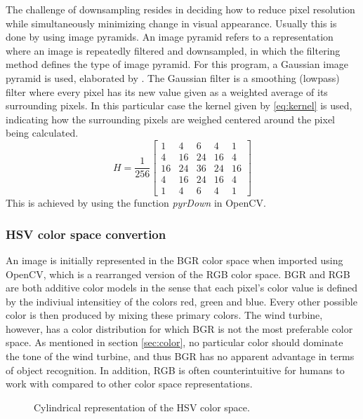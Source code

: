 \documentclass[a4paper,10pt]{article}
\begin{document}
      The challenge of downsampling resides in deciding how to reduce pixel resolution while simultaneously minimizing change in visual appearance. Usually this is done by using image pyramids. An image pyramid refers to a representation where an image is repeatedly filtered and downsampled, in which the filtering method defines the type of image pyramid. For this program, a Gaussian image pyramid is used, elaborated by \citet{birt81}. The Gaussian filter is a smoothing (lowpass) filter where every pixel has its new value given as a weighted average of its surrounding pixels. In this particular case the kernel given by \eqref{eq:kernel} is used, indicating how the surrounding pixels are weighed centered around the pixel being calculated.
      \begin{equation}
      \label{eq:kernel}
	H = \frac{1}{256}\begin{bmatrix} 
	     1 & 4 & 6 & 4 & 1 \\
	     4 & 16 & 24 & 16 & 4 \\
	     16 & 24 & 36 & 24 & 16 \\
	     4 & 16 & 24 & 16 & 4 \\
	     1 & 4 & 6 & 4 & 1
	    \end{bmatrix}
      \end{equation}
      This is achieved by using the function \emph{pyrDown} in OpenCV.
      
    \subsubsection{HSV color space convertion}
    An image is initially represented in the BGR color space when imported using OpenCV, which is a rearranged version of the RGB color space. BGR and RGB are both additive color models in the sense that each pixel's color value is defined by the indiviual intensitiey of the colors red, green and blue. Every other possible color is then produced by mixing these primary colors. The wind turbine, however, has a color distribution for which BGR is not the most preferable color space. As mentioned in section \ref{sec:color}, no particular color should dominate the tone of the wind turbine, and thus BGR has no apparent advantage in terms of object recognition. In addition, RGB is often counterintuitive for humans to work with compared to other color space representations.
    \begin{figure}[]
     \caption{Cylindrical representation of the HSV color space.}
     \label{fig:HSV}
    \end{figure}
\end{document}
